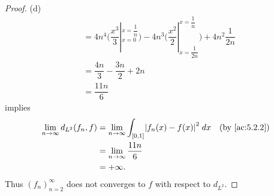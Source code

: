 \begin{proof}{(d)}
\begin{align*}
     & = 4n^4 \bigg(\dfrac{x^3}{3}|_{x = 0}^{x = \dfrac{1}{n}}\bigg) - 4n^3 \bigg(\dfrac{x^2}{2}|_{x = \dfrac{1}{2n}}^{x = \dfrac{1}{n}}\bigg) + 4n^2 \dfrac{1}{2n} \\
     & = \dfrac{4n}{3} - \dfrac{3n}{2} + 2n                                                                                                                         \\
     & = \dfrac{11n}{6}
  \end{align*}
  implies
  \begin{align*}
    \lim_{n \to \infty} d_{L^2}(f_n, f) & = \lim_{n \to \infty} \int_{[0, 1]} \abs{f_n(x) - f(x)}^2 \; dx &  & \by{ac:5.2.2} \\
                                        & = \lim_{n \to \infty} \dfrac{11n}{6}                                               \\
                                        & = +\infty.
  \end{align*}
  Thus \((f_n)_{n = 2}^\infty\) does not converges to \(f\) with respect to \(d_{L^2}\).
\end{proof}
